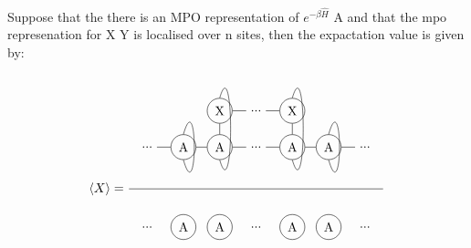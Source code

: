 Suppose that the there is an MPO representation of $ e^{ - \beta \hat{H} } $ A and that the mpo represenation for X Y is localised over n sites, then the expactation value is given by:

\begin{equation}
    \Braket{X} = \frac{
        \begin{tikzpicture} [   ]
            \clip (-1.5,-1) rectangle (5.5,2);

            \node[] (N0) at (-1,0) {...};
            \node[circle, draw] (N1) at (0,0) {A};
            \node[circle, draw] (N2) at (1,0) {A};
            \node[circle, draw] (X2) at (1,1) {X};

            \node[] (N3) at (2 ,0) {...};
            \node[] (X3) at (2,1) {...};

            \node[circle, draw] (N4) at (3 ,0) {A};
            \node[circle, draw] (X4) at (3,1) {X};

            \node[circle, draw] (N5) at (4 ,0) {A};
            \node[] (N6) at (5 ,0) {...};

            \draw  (N0) -- (N1) ;

            \draw  (N1) -- (N2) ;
            \draw  (N2) -- (N3) ;
            \draw  (N3) -- (N4) ;
            \draw  (N4) -- (N5) ;
            \draw  (N5) -- (N6) ;

            \draw  (X2) -- (X3) ;
            \draw  (X3) -- (X4) ;

            \draw  (N2) -- (X2) ;
            \draw  (N4) -- (X4) ;

            \draw (X2.north)   .. controls +(0.4,1.4) and +(0.4,-1.4) .. (N2.south);
            \draw (X4.north)   .. controls +(0.4,1.4) and +(0.4,-1.4) .. (N4.south);

            \draw (N1.north)   .. controls +(0.4,1.4) and +(0.4,-1.4) .. (N1.south);
            \draw (N5.north)   ..  controls +(0.4,1.4) and +(0.4,-1.4)  .. (N5.south);
        \end{tikzpicture}
    }{
        \begin{tikzpicture} [   ]

            \clip  (-1.5,-3) rectangle (5.5,-1);

            \node[] (O0) at (-1,-2) {...};
            \node[circle, draw] (O1) at (0,-2) {A};
            \node[circle, draw] (O2) at (1,-2) {A};

            \node[] (O3) at (2 ,-2) {...};
            \node[circle, draw] (O4) at (3 ,-2) {A};

            \node[circle, draw] (O5) at (4 ,-2) {A};
            \node[] (O6) at (5 ,-2) {...};


\end{tikzpicture}}
\end{equation}

